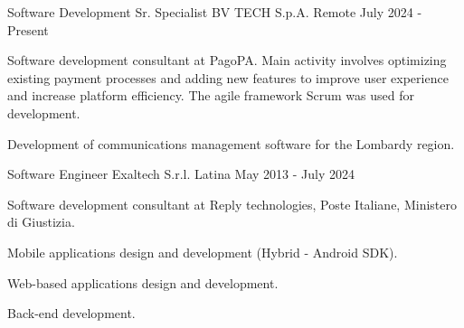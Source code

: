 

\begin{cventries}

  \cventry
    {Software Development Sr. Specialist} %
    {BV TECH S.p.A.} %
    {Remote} %
    {July 2024 - Present} %
    {
      \begin{cvitems} %
        \item {Software development consultant at PagoPA. Main activity involves optimizing existing payment processes and adding new features to improve user experience and increase platform efficiency. The agile framework Scrum was used for development.}
        \item {Development of communications management software for the Lombardy region.}  
      \end{cvitems}
    }

  \cventry
    {Software Engineer} %
    {Exaltech S.r.l.} %
    {Latina} %
    {May 2013 - July 2024} %
    {
      \begin{cvitems} %
        \item {Software development consultant at Reply technologies, Poste Italiane, Ministero di Giustizia.}
        \item {Mobile applications design and development (Hybrid - Android SDK).}
        \item {Web-based applications design and development.}  
        \item {Back-end development.}  
      \end{cvitems}
    }

\end{cventries}
